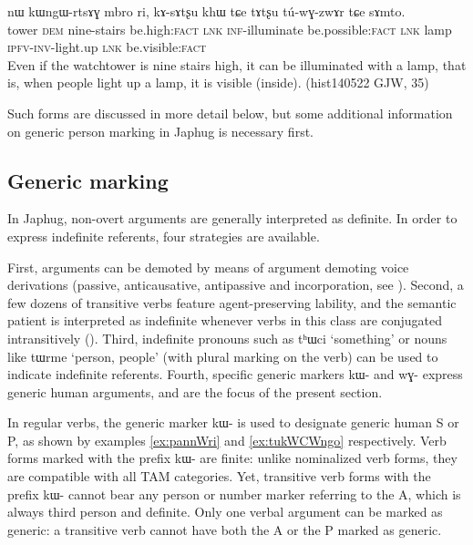 \documentclass[oldfontcommands,oneside,a4paper,11pt]{article}
\newcommand{\ipa}[1]{{\phon \mbox{#1}}} %
\begin{document}
\begin{exe}
\ex  \label{ex:tuwGzwAr}
\gll \ipa{ɣɟɯ} 	\ipa{nɯ} 	\ipa{kɯngɯ-rtsɤɣ} 	\ipa{mbro} 	\ipa{ri,} 	\ipa{kɤ-sɤtʂu} 	\ipa{khɯ} 	\ipa{tɕe} 	\ipa{tɤtʂu} 	\ipa{tú-wɣ-zwɤr} 	\ipa{tɕe} 	\ipa{sɤmto.}  \\
tower \textsc{dem} nine-stairs be.high:\textsc{fact} \textsc{lnk} \textsc{inf}-illuminate be.possible:\textsc{fact} \textsc{lnk} lamp \textsc{ipfv-inv}-light.up \textsc{lnk} be.visible:\textsc{fact} \\
\glt Even if the watchtower is nine stairs high, it can be illuminated with a lamp, that is, when people light up a lamp, it is visible (inside). (hist140522 GJW, 35)
\end{exe}

Such forms are discussed in more detail below, but some additional information on generic person marking in Japhug is necessary first.

\subsection{Generic marking}  \label{sec:genr.jpg}

In Japhug, non-overt arguments are generally interpreted as definite. In order to express indefinite referents, four strategies are available. 

First, arguments can be demoted by means of argument demoting voice derivations (passive, anticausative,  antipassive and incorporation, see \citealt{jacques12incorp, jacques14antipassive}). Second, a few dozens of transitive verbs feature agent-preserving lability, and the semantic patient is interpreted as indefinite whenever verbs in this class are conjugated intransitively (\citealt{jacques12demotion}).  Third, indefinite pronouns such as \ipa{tʰɯci} `something' or nouns like \ipa{tɯrme} `person, people' (with plural marking on the verb) can be used to indicate indefinite referents. Fourth,  specific generic markers \ipa{kɯ-} and \ipa{wɣ-} express generic human arguments, and are the focus of the present section. 



In regular verbs, the generic marker \ipa{kɯ-} is used to designate generic human S or P, as shown by examples \ref{ex:pannWri} and \ref{ex:tukWCWngo} respectively. Verb forms marked with the prefix \ipa{kɯ-} are  finite: unlike nominalized verb forms, they are compatible with all TAM categories. Yet, transitive verb forms with the prefix \ipa{kɯ-} cannot bear any person or number marker referring to the A, which is always third person and definite. Only one verbal argument can be marked as generic: a transitive verb cannot have both the A or the P marked as generic.
\end{document}
